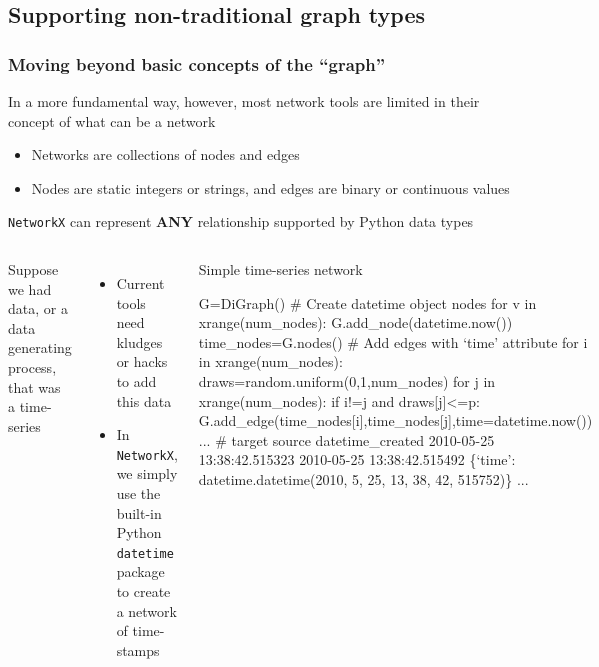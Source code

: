 \documentclass[xcolor=dvipsnames, 9pt]{beamer}
\newenvironment{code}{\begin{semiverbatim} \begin{footnotesize}}
{\end{footnotesize}\end{semiverbatim}}
\begin{document}
\begin{frame}[fragile]
\begin{center}
{\begin{columns}
\begin{center}
            \end{center}
        \end{columns}}
    \end{center}
\end{frame}


\subsection{Supporting non-traditional graph types} %
\label{sub:supporting_non_traditional_graph_types}

\begin{frame}[fragile]
    \frametitle{Moving beyond basic concepts of the ``graph''}
    In a more fundamental way, however, most network tools are limited in their concept of what can be a network
    \begin{itemize}
        \item Networks are collections of nodes and edges
        \item Nodes are static integers or strings, and edges are binary or continuous values
    \end{itemize}
    \texttt{NetworkX} can represent \textbf{ANY} relationship supported by Python data types
    \vspace{2mm}
    \begin{columns}
        \small{Suppose we had data, or a data generating process, that was a time-series
        \begin{itemize}
            \item Current tools need kludges or hacks to add this data
            \item In \texttt{NetworkX}, we simply use the built-in Python \texttt{datetime} package to create a network of time-stamps
        \end{itemize}}
        \begin{block}{\scriptsize{Simple time-series network}}
            \begin{code}
\tiny{G=DiGraph()
\alert<2>{# Create datetime object nodes}
for v in xrange(num_nodes):
    G.add_node(datetime.now())
time_nodes=G.nodes()
\alert<3>{# Add edges with `time' attribute}
for i in xrange(num_nodes):
    draws=random.uniform(0,1,num_nodes)
    for j in xrange(num_nodes):
        if i!=j and draws[j]<=p:
            G.add_edge(time_nodes[i],time_nodes[j],time=datetime.now())
...
\alert<4>{# target source datetime_created}
2010-05-25 13:38:42.515323 2010-05-25 13:38:42.515492 
    \{`time': datetime.datetime(2010, 5, 25, 13, 38, 42, 515752)\}
...}
                \end{code}
            \end{block}
    \end{columns}
\end{frame}
\end{document}
